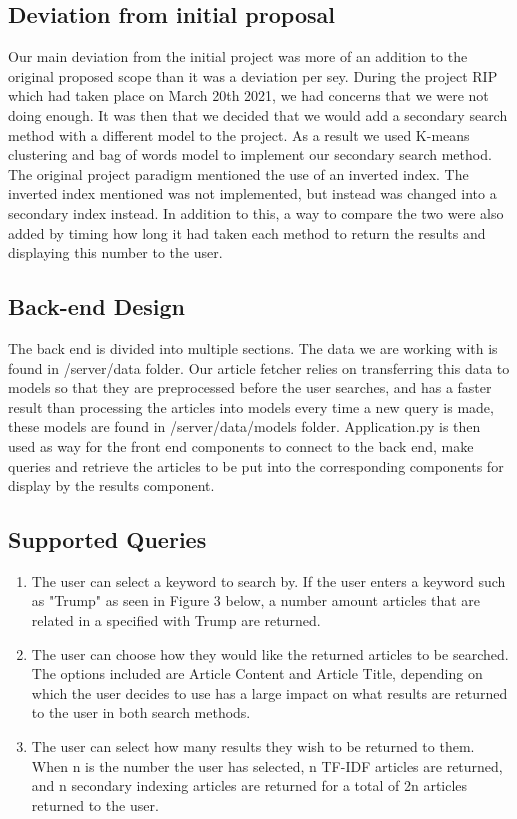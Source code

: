 \documentclass{article}
\begin{document}
\subsection{Deviation from initial proposal}
Our main deviation from the initial project was more of an addition to the original proposed scope than it was a deviation per sey.
During the project RIP which had taken place on March 20th 2021, we had concerns that we were not doing enough.
It was then that we decided that we would add a secondary search method with a different model to the project. As a result we used K-means clustering and bag of words model to implement our secondary search method.
The original project paradigm mentioned the use of an inverted index.
The inverted index mentioned was not implemented, but instead was changed into a secondary index instead.
In addition to this, a way to compare the two were also added by timing how long it had taken each method to return the results and displaying this number to the user.

\subsection{Back-end Design}
The back end is divided into multiple sections. \newline
The data we are working with is found in /server/data folder. \newline
Our article fetcher relies on transferring this data to models so that they are preprocessed before the user searches, and has a faster result than processing the articles into models every time a new query is made, these models are found in /server/data/models folder.\newline
Application.py is then used as way for the front end components to connect to the back end, make queries and retrieve the articles to be put into the corresponding components for display by the results component.
\subsection{Supported Queries}
\begin{enumerate}
    \item The user can select a keyword to search by. If the user enters a keyword such as "Trump" as seen in Figure 3 below, a number amount articles that are related in a specified with Trump are returned.
    \item The user can choose how they would like the returned articles to be searched. The options included are Article Content and Article Title, depending on which the user decides to use has a large impact on what results are returned to the user in both search methods.
    \item The user can select how many results they wish to be returned to them. When n is the number the user has selected, n TF-IDF articles are returned, and n secondary indexing articles are returned for a total of 2n articles returned to the user.
\end{enumerate}
\end{document}
